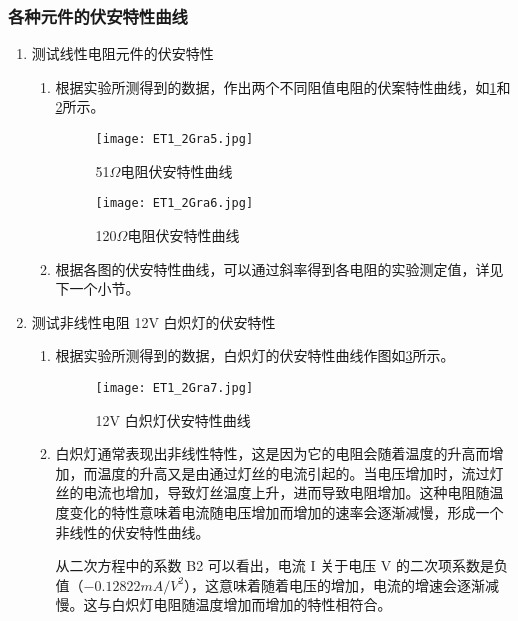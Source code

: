 \documentclass[dvipsnames, svgnames,a4paper,11pt]{article}
\begin{document}
	\subsubsection{各种元件的伏安特性曲线}
	\begin{enumerate}
		\item 测试线性电阻元件的伏安特性
		\begin{enumerate}
			\item 根据实验所测得到的数据，作出两个不同阻值电阻的伏案特性曲线，如\cref{fig:fig5}和\cref{fig:fig6}所示。
			
			\begin{figure}[htbp]
				\centering
				\texttt{[image: ET1\_2Gra5.jpg]}
				\caption{51$\Omega$电阻伏安特性曲线}
				\label{fig:fig5}
			\end{figure}
			
			\begin{figure}[htbp]
				\centering
				\texttt{[image: ET1\_2Gra6.jpg]}
				\caption{120$\Omega$电阻伏安特性曲线}
				\label{fig:fig6}
			\end{figure}
			
			\item 根据各图的伏安特性曲线，可以通过斜率得到各电阻的实验测定值，详见下一个小节。
		\end{enumerate}
				
		\item 测试非线性电阻 12V 白炽灯的伏安特性
		\begin{enumerate}
			\item 根据实验所测得到的数据，白炽灯的伏安特性曲线作图如\cref{fig:fig7}所示。
			
			\begin{figure}[htbp]
				\centering
				\texttt{[image: ET1\_2Gra7.jpg]}
				\caption{12V 白炽灯伏安特性曲线}
				\label{fig:fig7}
			\end{figure}
			
			\item 白炽灯通常表现出非线性特性，这是因为它的电阻会随着温度的升高而增加，而温度的升高又是由通过灯丝的电流引起的。当电压增加时，流过灯丝的电流也增加，导致灯丝温度上升，进而导致电阻增加。这种电阻随温度变化的特性意味着电流随电压增加而增加的速率会逐渐减慢，形成一个非线性的伏安特性曲线。
			
			从二次方程中的系数 B2 可以看出，电流 I 关于电压 V 的二次项系数是负值（$-0.12822 mA/V^2$），这意味着随着电压的增加，电流的增速会逐渐减慢。这与白炽灯电阻随温度增加而增加的特性相符合。
			

\end{enumerate}
\end{enumerate}
\end{document}
